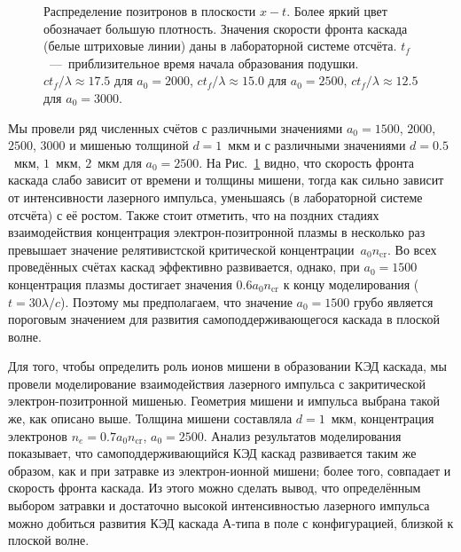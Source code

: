 \begin{figure}[h!]
    \caption[Распределение позитронов в плоскости $x-t$ в численных моделированиях с различными начальными параметрами]{
        \label{fig:ch2/cushion-x-t}
        Распределение позитронов в плоскости $x-t$. Более яркий цвет обозначает большую плотность. Значения скорости фронта каскада (белые штриховые линии) даны в лабораторной системе отсчёта. $t_{f}$~---~приблизительное время начала образования подушки. $ct_{f}/\lambda\approx17.5$ для $a_{0}=2000$, $ct_{f}/\lambda\approx15.0$ для $a_{0}=2500$, $ct_{f}/\lambda\approx12.5$ для $a_{0}=3000$.}
\end{figure}

Мы провели ряд численных счётов с различными значениями $a_{0}=1500$, $2000$, $2500$, $3000$ и мишенью толщиной $d=1$~мкм и с различными значениями $d=0.5$~мкм, $1$~мкм, $2$~мкм для $a_{0}=2500$. 
На Рис.~\ref{fig:ch2/cushion-x-t} видно, что скорость фронта каскада слабо зависит от времени и толщины мишени, тогда как сильно зависит от интенсивности лазерного импульса, уменьшаясь (в лабораторной системе отсчёта) с её ростом. 
Также стоит отметить, что на поздних стадиях взаимодействия концентрация электрон-позитронной плазмы в несколько раз превышает значение релятивистской критической концентрации~$a_0 n_\mathrm{cr}$. 
Во всех проведённых счётах каскад эффективно развивается, однако, при $a_0=1500$ концентрация плазмы достигает значения $0.6 a_0 n_\mathrm{cr}$ к концу моделирования ($t = 30 \lambda/c$).
Поэтому мы предполагаем, что значение $a_0=1500$ грубо является пороговым значением для развития самоподдерживающегося каскада в плоской волне.

Для того, чтобы определить роль ионов мишени в образовании КЭД каскада, мы провели моделирование взаимодействия лазерного импульса с закритической электрон-позитронной мишенью. 
Геометрия мишени и импульса выбрана такой же, как описано выше. 
Толщина мишени составляла $d=1$~мкм, концентрация электронов $n_e = 0.7 a_0 n_\mathrm{cr}$, $a_0=2500$. 
Анализ результатов моделирования показывает, что самоподдерживающийся КЭД каскад развивается таким же образом, как и при затравке из электрон-ионной мишени; более того, совпадает и скорость фронта каскада. 
Из этого можно сделать вывод, что определённым выбором затравки и достаточно высокой интенсивностью лазерного импульса можно добиться развития КЭД каскада А-типа в поле с конфигурацией, близкой к плоской волне.

